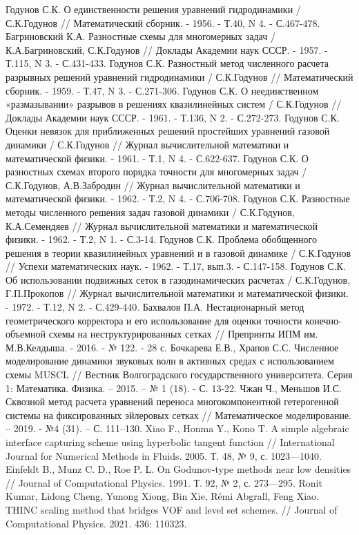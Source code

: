 \documentclass[12pt,a4paper]{article}
\begin{document}
\newpage
\begin{thebibliography}{3}
Годунов С.К. О единственности решения уравнений гидродинамики / С.К.Годунов // Математический сборник. - 1956. - Т.40, N 4. - С.467-478.
Багриновский К.А. Разностные схемы для многомерных задач / К.А.Багриновский, С.К.Годунов // Доклады Академии наук СССР. - 1957. - Т.115, N 3. - С.431-433.
Годунов С.К. Разностный метод численного расчета разрывных решений уравнений гидродинамики / С.К.Годунов // Математический сборник. - 1959. - Т.47, N 3. - С.271-306.
Годунов С.К. О неединственном «размазывании» разрывов в решениях квазилинейных систем / С.К.Годунов // Доклады Академии наук СССР. - 1961. - Т.136, N 2. - С.272-273.
Годунов С.К. Оценки невязок для приближенных решений простейших уравнений газовой динамики / С.К.Годунов // Журнал вычислительной математики и математической физики. - 1961. - Т.1, N 4. - С.622-637.
Годунов С.К. О разностных схемах второго порядка точности для многомерных задач / С.К.Годунов, А.В.Забродин // Журнал вычислительной математики и математической физики. - 1962. - Т.2, N 4. - С.706-708.
Годунов С.К. Разностные методы численного решения задач газовой динамики / С.К.Годунов, К.А.Семендяев // Журнал вычислительной математики и математической физики. - 1962. - Т.2, N 1. - С.3-14.
Годунов С.К. Проблема обобщенного решения в теории квазилинейных уравнений и в газовой динамике / С.К.Годунов // Успехи математических наук. - 1962. - Т.17, вып.3. - С.147-158.
Годунов С.К. Об использовании подвижных сеток в газодинамических расчетах / С.К.Годунов, Г.П.Прокопов // Журнал вычислительной математики и математической физики. - 1972. - Т.12, N 2. - С.429-440.
Бахвалов П.А. Нестационарный метод геометрического корректора и его использование для оценки точности конечно-объемной схемы на неструктурированных сетках // Препринты ИПМ им. М.В.Келдыша. - 2016. - № 122. - 28 с.
Бочкарева Е.В., Храпов С.С. Численное моделирование динамики звуковых волн в активных средах с использованием схемы MUSCL // Вестник Волгоградского государственного университета. Серия 1: Математика. Физика. – 2015. – № 1 (18). - С. 13-22.
Чжан Ч., Меньшов И.С. Сквозной метод расчета уравнений переноса многокомпонентной гетерогенной системы на фиксированных эйлеровых сетках // Математическое моделирование. – 2019. - №4 (31). – С. 111–130.
Xiao F., Honma Y., Kono T. A simple algebraic interface capturing scheme using hyperbolic tangent function // International Journal for Numerical Methods in Fluids. 2005. Т. 48, № 9, с. 1023—1040.
Einfeldt B., Munz C. D., Roe P. L. On Godunov-type methods near low densities // Journal of Computational Physics. 1991. Т. 92, № 2, с. 273—295.
Ronit Kumar, Lidong Cheng, Yunong Xiong, Bin Xie, Rémi Abgrall, Feng Xiao. THINC scaling method that bridges VOF and level set schemes. // Journal of Computational Physics. 2021. 436: 110323.
\end{thebibliography}
\end{document}
